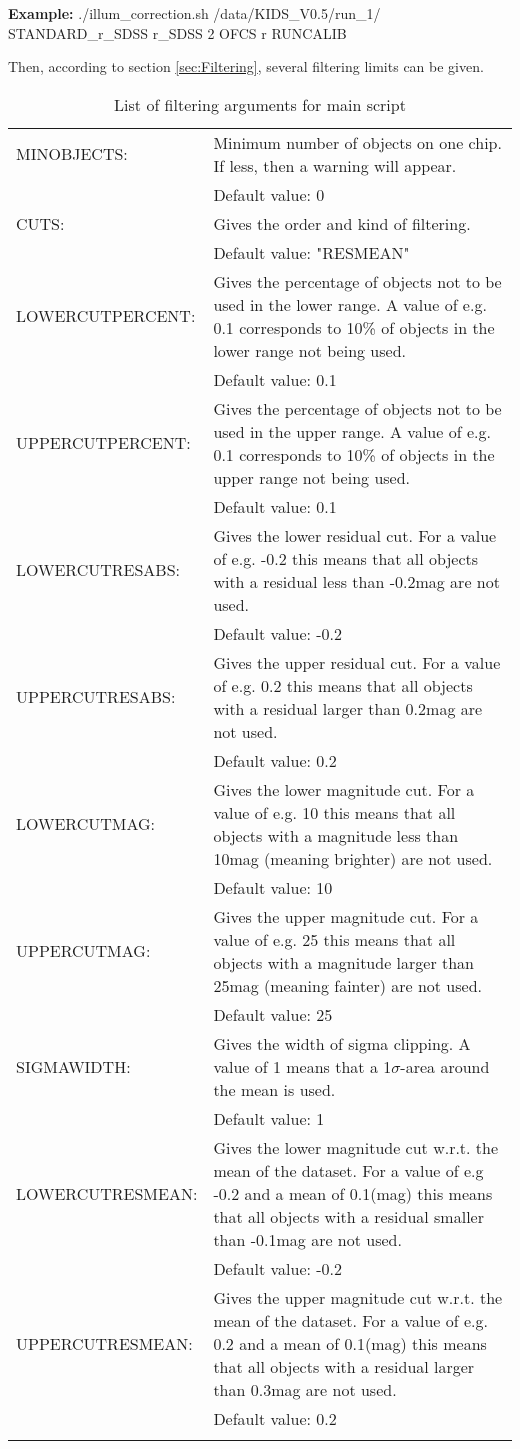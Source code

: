 \textbf{Example:} ./illum\_correction.sh /data/KIDS\_V0.5/run\_1/ STANDARD\_r\_SDSS r\_SDSS 2 OFCS r RUNCALIB

Then, according to section \ref{sec:Filtering}, several filtering limits can be given.
\begin{longtable}{lp{9.5cm}}
MINOBJECTS: & Minimum number of objects on one chip. If less, then a warning will appear.\\
 & Default value: 0\\
CUTS: & Gives the order and kind of filtering.\\
 & Default value: "RESMEAN"\\
LOWERCUTPERCENT: & Gives the percentage of objects not to be used in the lower range. A value of e.g. 0.1 corresponds to 10\% of objects in the lower range not being used.\\
 & Default value: 0.1\\
UPPERCUTPERCENT: & Gives the percentage of objects not to be used in the upper range. A value of e.g. 0.1 corresponds to 10\% of objects in the upper range not being used.\\
 & Default value: 0.1\\
LOWERCUTRESABS: & Gives the lower residual cut. For a value of e.g. -0.2 this means that all objects with a residual less than -0.2mag are not used.\\
 & Default value: -0.2\\
UPPERCUTRESABS: & Gives the upper residual cut. For a value of e.g. 0.2 this means that all objects with a residual larger than 0.2mag are not used.\\
 & Default value: 0.2\\
LOWERCUTMAG: & Gives the lower magnitude cut. For a value of e.g. 10 this means that all objects with a magnitude less than 10mag (meaning brighter) are not used.\\
 & Default value: 10\\
UPPERCUTMAG: & Gives the upper magnitude cut. For a value of e.g. 25 this means that all objects with a magnitude larger than 25mag (meaning fainter) are not used.\\
 & Default value: 25\\
SIGMAWIDTH: & Gives the width of sigma clipping. A value of 1 means that a 1$\sigma$-area around the mean is used.\\
 & Default value: 1\\
LOWERCUTRESMEAN: & Gives the lower magnitude cut w.r.t. the mean of the dataset. For a value of e.g -0.2 and a mean of 0.1(mag) this means that all objects with a residual smaller than -0.1mag are not used.\\
 & Default value: -0.2\\
UPPERCUTRESMEAN: & Gives the upper magnitude cut w.r.t. the mean of the dataset. For a value of e.g. 0.2 and a mean of 0.1(mag) this means that all objects with a residual larger than 0.3mag are not used.\\
 & Default value: 0.2\\
\caption{List of filtering arguments for main script}
\label{tab:FilteringArgumentsMainScript}
\end{longtable}


